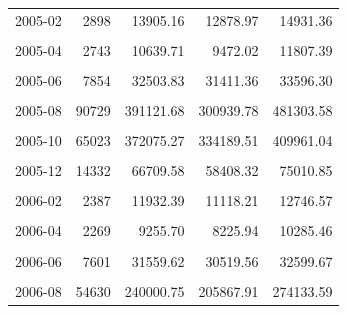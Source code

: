\begin{longtable}[t]{crrrr}
2005-02 & 2898 & 13905.16 & 12878.97 & 14931.36\\
\cellcolor{gray!10}{2005-03} & \cellcolor{gray!10}{2528} & \cellcolor{gray!10}{10558.72} & \cellcolor{gray!10}{9393.12} & \cellcolor{gray!10}{11724.32}\\
2005-04 & 2743 & 10639.71 & 9472.02 & 11807.39\\
\cellcolor{gray!10}{2005-05} & \cellcolor{gray!10}{5075} & \cellcolor{gray!10}{19800.89} & \cellcolor{gray!10}{18474.21} & \cellcolor{gray!10}{21127.57}\\
2005-06 & 7854 & 32503.83 & 31411.36 & 33596.30\\
\cellcolor{gray!10}{2005-07} & \cellcolor{gray!10}{30238} & \cellcolor{gray!10}{86030.36} & \cellcolor{gray!10}{48218.34} & \cellcolor{gray!10}{123842.39}\\
2005-08 & 90729 & 391121.68 & 300939.78 & 481303.58\\
\cellcolor{gray!10}{2005-09} & \cellcolor{gray!10}{102455} & \cellcolor{gray!10}{484443.68} & \cellcolor{gray!10}{439737.13} & \cellcolor{gray!10}{529150.23}\\
2005-10 & 65023 & 372075.27 & 334189.51 & 409961.04\\
\cellcolor{gray!10}{2005-11} & \cellcolor{gray!10}{31631} & \cellcolor{gray!10}{147922.82} & \cellcolor{gray!10}{119745.00} & \cellcolor{gray!10}{176100.63}\\
2005-12 & 14332 & 66709.58 & 58408.32 & 75010.85\\
\cellcolor{gray!10}{2006-01} & \cellcolor{gray!10}{4531} & \cellcolor{gray!10}{23296.00} & \cellcolor{gray!10}{19696.17} & \cellcolor{gray!10}{26895.83}\\
2006-02 & 2387 & 11932.39 & 11118.21 & 12746.57\\
\cellcolor{gray!10}{2006-03} & \cellcolor{gray!10}{2426} & \cellcolor{gray!10}{10216.69} & \cellcolor{gray!10}{9019.75} & \cellcolor{gray!10}{11413.63}\\
2006-04 & 2269 & 9255.70 & 8225.94 & 10285.46\\
\cellcolor{gray!10}{2006-05} & \cellcolor{gray!10}{4313} & \cellcolor{gray!10}{17229.91} & \cellcolor{gray!10}{16162.03} & \cellcolor{gray!10}{18297.79}\\
2006-06 & 7601 & 31559.62 & 30519.56 & 32599.67\\
\cellcolor{gray!10}{2006-07} & \cellcolor{gray!10}{17788} & \cellcolor{gray!10}{63455.57} & \cellcolor{gray!10}{51318.17} & \cellcolor{gray!10}{75592.97}\\
2006-08 & 54630 & 240000.75 & 205867.91 & 274133.59\\

\end{longtable}
